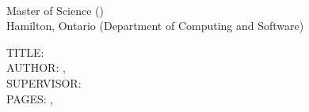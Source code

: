 \noindent
\thesisInstitution{} \\
Master of Science (\the\year{}) \\
Hamilton, Ontario (Department of Computing and Software)

\vspace{2cm}

\noindent
TITLE: \thesisTitle{} \\
AUTHOR: \thesisAuthorName{}, \thesisAuthorCredentials{} \\
SUPERVISOR: \thesisSupervisor{} \\
PAGES: \pageref{lastOfFrontMatter}, \pageref{LastPage}
